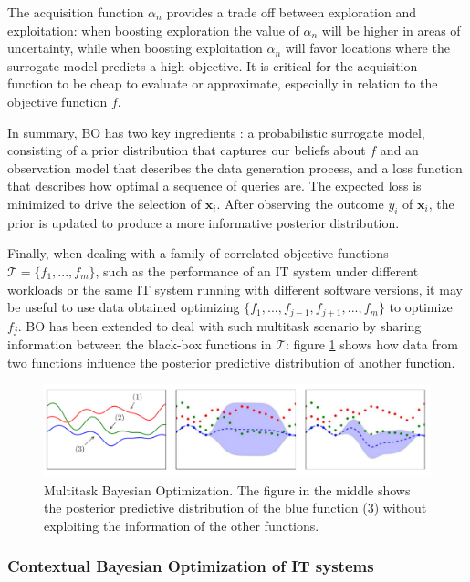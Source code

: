 \documentclass[a4paper, 12pt]{article} %
\begin{document}
	The acquisition function $\alpha_n$ provides a trade off between exploration and exploitation: when boosting exploration the value of $\alpha_n$ will be higher in areas of uncertainty, while when boosting exploitation $\alpha_n$ will favor locations where the surrogate model predicts a high objective. It is critical for the acquisition function to be cheap to evaluate or approximate, especially in relation to the objective function $f$.
	
	In summary, BO has two key ingredients \cite{BO}: a probabilistic surrogate model, consisting of a prior distribution that captures our beliefs about $f$ and an observation model that describes the data generation process, and a loss function that describes how optimal a sequence of queries are. The expected loss is minimized to drive the selection of $\pmb{x}_i$. After observing the outcome $y_i$ of $\pmb{x}_i$, the prior is updated to produce a more informative posterior distribution.
	
	Finally, when dealing with a family of correlated objective functions $\mathcal{T}=\{f_1, ..., f_m\}$, such as the performance of an IT system under different workloads or the same IT system running with different software versions, it may be useful to use data obtained optimizing $\{f_1, ..., f_{j-1}, f_{j+1}, ..., f_m\}$ to optimize $f_j$. BO has been extended to deal with such multitask scenario \cite{CGPBanditOptimization} by sharing information between the black-box functions in $\mathcal{T}$: figure \ref{fig:multitask_bo} shows how data from two functions influence the posterior predictive distribution of another function.
	\begin{figure} \label{fig:multitask_bo}
		\includegraphics[width=\linewidth]{img/multitask_bo.png}
		\caption{Multitask Bayesian Optimization. The figure in the middle shows the posterior predictive distribution of the blue function (3) without exploiting the information of the other functions.}
	\end{figure}
	
	\subsubsection{Contextual Bayesian Optimization of IT systems} \label{ssec:contextual_bayesian_optimization}
	
\end{document}
